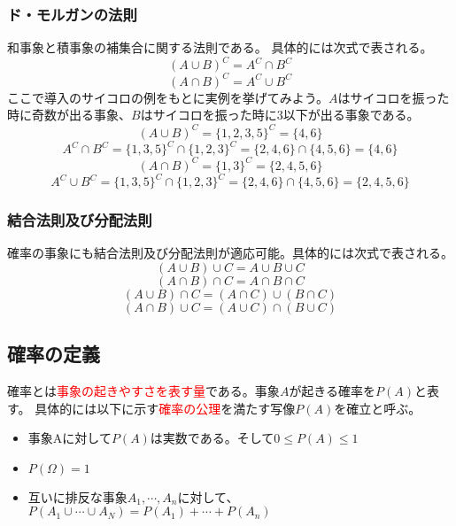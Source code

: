\documentclass[a4paper,10pt]{jarticle}
\begin{document}
\subsubsection{ド・モルガンの法則}
和事象と積事象の補集合に関する法則である。
具体的には次式で表される。
\begin{equation}
    (A\cup B)^C = A^C\cap B^C\tag{1,2}
\end{equation}
\begin{equation}
    (A\cap B)^C = A^C\cup B^C\tag{1,3}
\end{equation}
ここで導入のサイコロの例をもとに実例を挙げてみよう。$A$はサイコロを振った時に奇数が出る事象、$B$はサイコロを振った時に3以下が出る事象である。
\begin{equation}
    (A\cup B)^C = \{1,2,3,5\}^C=\{4,6\}\tag{1,4}
\end{equation}
\begin{equation}
    A^C\cap B^C = \{1,3,5\}^C\cap\{1,2,3\}^C=\{2,4,6\}\cap\{4,5,6\}=\{4,6\}\tag{1,5}
\end{equation}
\begin{equation}
    (A\cap B)^C = \{1,3\}^C = \{2,4,5,6\}\tag{1,6}
\end{equation}
\begin{equation}
    A^C\cup B^C = \{1,3,5\}^C\cap\{1,2,3\}^C=\{2,4,6\}\cap\{4,5,6\} = \{2,4,5,6\}\tag{1,7}
\end{equation}
\subsubsection{結合法則及び分配法則}
確率の事象にも結合法則及び分配法則が適応可能。具体的には次式で表される。
\begin{equation}
    (A\cup B)\cup C = A\cup B \cup C\tag{1,8}
\end{equation}
\begin{equation}
    (A\cap B)\cap C = A\cap B\cap C \tag{1,9}
\end{equation}
\begin{equation}
    (A\cup B)\cap C = (A\cap C)\cup(B\cap C)\tag{1,10}
\end{equation}
\begin{equation}
    (A\cap B)\cup C = (A\cup C)\cap(B\cup C)\tag{1,11}
\end{equation}
\subsection{確率の定義}
確率とは\textcolor{red}{事象の起きやすさを表す量}である。事象$A$が起きる確率を$P(A)$と表す。
具体的には以下に示す\textcolor{red}{確率の公理}を満たす写像$P(A)$を確立と呼ぶ。
\begin{itemize}
    \item 事象Aに対して$P(A)$は実数である。そして$0\leq P(A)\leq 1$
    \item $P(\Omega)=1$
    \item 互いに排反な事象$A_1,\cdots,A_n$に対して、$P(A_1\cup\cdots\cup A_N)=P(A_1)+\cdots+P(A_n)$
\end{itemize}
\end{document}
